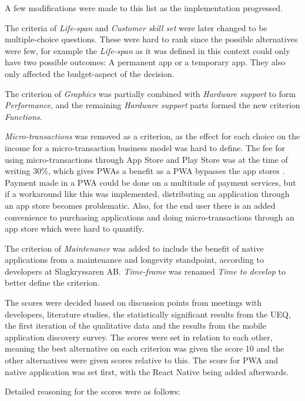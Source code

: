 

A few modifications were made to this list as the implementation progressed.

The criteria of \textit{Life-span} and \textit{Customer skill set} were later changed to be multiple-choice questions. These were hard to rank since the possible alternatives were few, for example the \textit{Life-span} as it was defined in this context could only have two possible outcomes: A permanent app or a temporary app. They also only affected the budget-aspect of the decision.

The criterion of \textit{Graphics} was partially combined with \textit{Hardware support} to form \textit{Performance}, and the remaining \textit{Hardware support} parts formed the new criterion \textit{Functions}.

\textit{Micro-transactions} was removed as a criterion, as the effect for each choice on the income for a micro-transaction business model was hard to define. The fee for using micro-transactions through App Store and Play Store was at the time of writing 30\%, which gives PWAs a benefit as a PWA bypasses the app stores \cite{IAPcost30}. Payment made in a PWA could be done on a multitude of payment services, but if a workaround like this was implemented, distributing an application through an app store becomes problematic. Also, for the end user there is an added convenience to purchasing applications and doing micro-transactions through an app store which were hard to quantify.

The criterion of \textit{Maintenance} was added to include the benefit of native applications from a maintenance and longevity standpoint, according to developers at Slagkryssaren AB.
\textit{Time-frame} was renamed \textit{Time to develop} to better define the criterion. 

The scores were decided based on discussion points from meetings with developers, literature studies, the statistically significant results from the UEQ, the first iteration of the qualitative data and the results from the mobile application discovery survey. The scores were set in relation to each other, meaning the best alternative on each criterion was given the score 10 and the other alternatives were given scores relative to this. The score for PWA and native application was set first, with the React Native being added afterwards.

Detailed reasoning for the scores were as follows:

